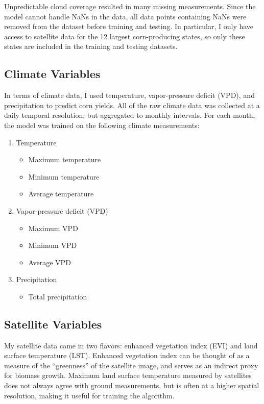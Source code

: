 \documentclass[letterpaper]{article}
\begin{document}
Unpredictable cloud coverage resulted in many missing measurements. Since the model cannot handle NaNs in the data, all data points containing NaNs were removed from the dataset before training and testing. In particular, I only have access to satellite data for the 12 largest corn-producing states, so only these states are included in the training and testing datasets.

\subsection{Climate Variables}

In terms of climate data, I used temperature, vapor-pressure deficit (VPD), and precipitation to predict corn yields. All of the raw climate data was collected at a daily temporal resolution, but aggregated to monthly intervals. For each month, the model was trained on the following climate measurements:

\begin{enumerate}
    \item Temperature
    \begin{itemize}
        \item Maximum temperature
        \item Minimum temperature
        \item Average temperature
    \end{itemize}
    \item Vapor-pressure deficit (VPD)
    \begin{itemize}
        \item Maximum VPD
        \item Minimum VPD
        \item Average VPD
    \end{itemize}
    \item Precipitation
    \begin{itemize}
        \item Total precipitation
    \end{itemize}
\end{enumerate}

\subsection{Satellite Variables}

My satellite data came in two flavors: enhanced vegetation index (EVI) and land surface temperature (LST). Enhanced vegetation index can be thought of as a measure of the ``greenness'' of the satellite image, and serves as an indirect proxy for biomass growth. Maximum land surface temperature measured by satellites does not always agree with ground measurements, but is often at a higher spatial resolution, making it useful for training the algorithm.
\end{document}
